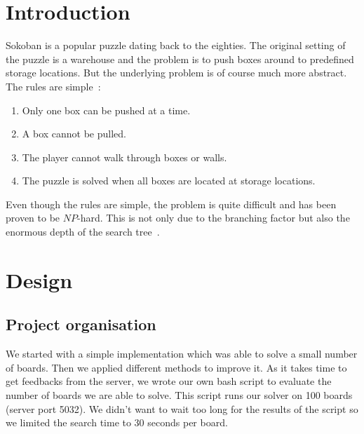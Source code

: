 \documentclass[a4paper,10pt]{article}
\begin{document}
\cleardoublepage
\tableofcontents
\newpage




\section{Introduction}

    Sokoban is a popular puzzle dating back to the eighties.  
    The original setting of the puzzle is a warehouse and the problem is to push boxes
    around to predefined storage locations.  
    But the underlying problem is of course much more abstract.  The rules are simple~\cite{wiki_soko}: 
    \begin{enumerate}[I]
        \item  Only one box can be pushed at a time.
        \item A box cannot be pulled.
        \item The player cannot walk through boxes or walls.
        \item The puzzle is solved when all boxes are located at storage locations.
    \end{enumerate}
    Even though the rules are simple, the problem is quite difficult and has been proven to be $NP$-hard.
    This is not only due to the branching factor but also the 
    enormous depth of the search tree~\cite{wiki_soko}.
    
\section{Design}
    \subsection{Project organisation}
	We started with a simple implementation which was able to solve a small number of boards. 
	Then we applied different methods to improve it.
	As it takes time to get feedbacks from the server, we wrote our own bash script to evaluate the number of boards we are able to solve.
	This script runs our solver on 100 boards (server port 5032).
	We didn't want to wait too long for the results of the script so we limited the search time to 30 seconds per board.
\end{document}
